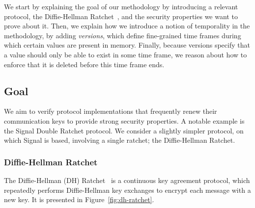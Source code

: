 We start by explaining the goal of our methodology by introducing a relevant protocol, the Diffie-Hellman Ratchet~\cite{perrin2016double}, and the security properties we want to prove about it.
Then, we explain how we introduce a notion of temporality in the methodology, by adding  \emph{versions}, which define fine-grained time frames during which certain values are present in memory.
Finally, because versions specify that a value should only be able to exist in some time frame, we reason about how to enforce that it is deleted before this time frame ends.

\subsection{Goal}
\label{sec:goal}

We aim to verify protocol implementations that frequently renew their communication keys to provide strong security properties.
A notable example is the Signal Double Ratchet protocol.
We consider a slightly simpler protocol, on which Signal is based, involving a single ratchet; the Diffie-Hellman Ratchet.

\subsubsection{Diffie-Hellman Ratchet}
\label{sec:diffie-hellman-ratchet}

The Diffie-Hellman (DH) Ratchet~\cite{perrin2016double} is a continuous key agreement protocol, which repeatedly performs Diffie-Hellman key exchanges to encrypt each message with a new key.
It is presented in Figure~\ref{fig:dh-ratchet}.

